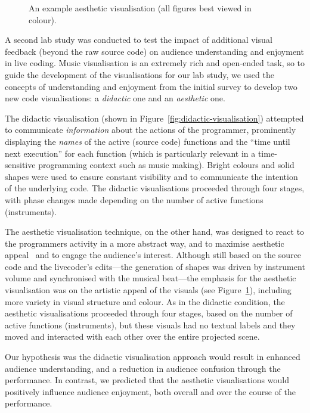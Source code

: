 \documentclass{sig-alternate}
\begin{document}
\begin{figure}
\centering
{}
\caption{An example aesthetic visualisation (all
  figures best viewed in colour).}
\label{fig:aesthetic-visualisation}
\end{figure}

A second lab study was conducted to test the impact of additional
visual feedback (beyond the raw source code) on audience understanding
and enjoyment in live coding. Music visualisation is an extremely rich
and open-ended task, so to guide the development of the visualisations
for our lab study, we used the concepts of understanding and enjoyment
from the initial survey to develop two new code visualisations: a
\emph{didactic} one and an \emph{aesthetic} one.

The didactic visualisation (shown in
Figure~\ref{fig:didactic-visualisation}) attempted to communicate
\emph{information} about the actions of the programmer, prominently
displaying the \emph{names} of the active (source code) functions and
the ``time until next execution'' for each function (which is
particularly relevant in a time-sensitive programming context such as
music making). Bright colours and solid shapes were used to ensure
constant visibility and to communicate the intention of the underlying
code. The didactic visualisations proceeded through four stages, with
phase changes made depending on the number of active functions
(instruments).

The aesthetic visualisation technique, on the other hand, was designed
to react to the programmers activity in a more abstract way, and to
maximise aesthetic appeal~\cite{Cawthon2007} and to engage the
audience's interest. Although still based on the source code and the
livecoder's edits---the generation of shapes was driven by instrument
volume and synchronised with the musical beat---the emphasis for the
aesthetic visualisation was on the artistic appeal of the visuals (see
Figure~\ref{fig:aesthetic-visualisation}), including more variety in
visual structure and colour. As in the didactic condition, the
aesthetic visualisations proceeded through four stages, based on the
number of active functions (instruments), but these visuals had no
textual labels and they moved and interacted with each other over the
entire projected scene.

Our hypothesis was the didactic visualisation approach would result in
enhanced audience understanding, and a reduction in audience confusion
through the performance. In contrast, we predicted that the aesthetic
visualisations would positively influence audience enjoyment, both
overall and over the course of the performance.
\end{document}
